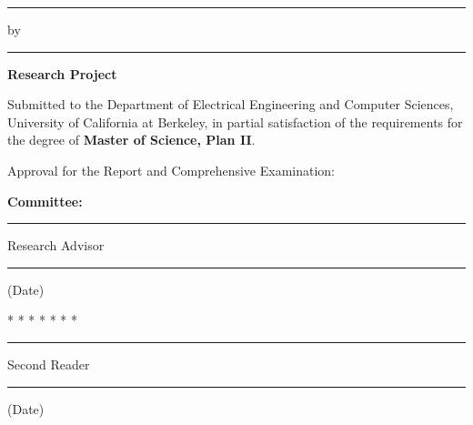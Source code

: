 \makeatletter
\thispagestyle{empty}

\begin{center}
\rule{6.5in}{0.40mm}

\vspace{0.1in}
    {\large \textbf{\@title} }

\vspace{0.1in}
    {\large by \@author }

\vspace{0.1in}
\rule{6.5in}{0.40mm}

\vspace{0.1in}
    {\large {\textbf{Research Project}}}
\end{center}

\noindent Submitted to the Department of Electrical Engineering and
Computer Sciences, University of California at Berkeley,
in partial satisfaction of the requirements for the degree
of \textbf{Master of Science, Plan II}.

\vspace{0.15in}
\noindent Approval for the Report and Comprehensive Examination:

\begin{center}
    \textbf{ Committee:}

\vspace{0.25in}
\rule{3.5in}{0.25mm}

\@chair

Research Advisor

\vspace{0.25in}
\rule{3.5in}{0.25mm}

(Date)

\vspace{0.25in}
* * * * * * *

\vspace{0.25in}
\rule{3.5in}{0.25mm}

\@othermembers

Second Reader

\vspace{0.25in}
\rule{3.5in}{0.25mm}

(Date)
\end{center}
\makeatother
